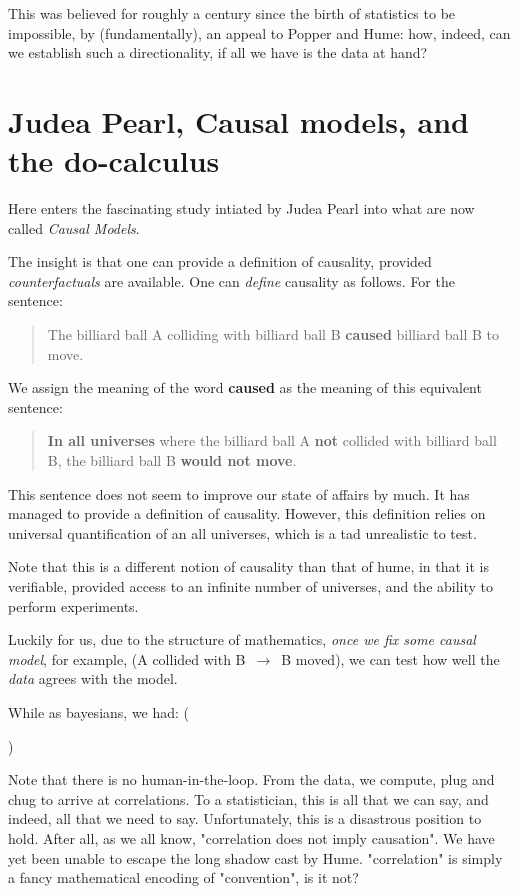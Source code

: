 \documentclass{article}
\begin{document}
This was believed for roughly a century since the birth of statistics to be
impossible, by (fundamentally), an appeal to Popper and Hume: how, indeed,
can we establish such a directionality, if all we have is the data at hand?

\section{Judea Pearl, Causal models, and the do-calculus}

Here enters the fascinating study intiated by Judea Pearl into what are now
called \emph{Causal Models}. 

The insight is that one can provide a definition of causality, provided
\emph{counterfactuals} are available. One can \textit{define} causality 
as follows. For the sentence:
\begin{quote}
    The billiard ball A colliding with billiard ball B \textbf{caused} billiard ball B to move.
\end{quote}
We assign the meaning of the word \textbf{caused} as the meaning of this
equivalent sentence:
\begin{quote}
    \textbf{In all universes} where the billiard ball A \textbf{not} collided with
    billiard ball B, the billiard ball B \textbf{would not move}.
\end{quote}

This sentence does not seem to improve our state of affairs by much. It has managed
to provide a definition of causality. However, this definition relies on universal
quantification of an all universes, which is a tad unrealistic to test.

Note that this is a different notion of causality than that of hume, in that
it is verifiable, provided access to an infinite number of universes, and the
ability to perform experiments.

Luckily for us, due to the structure of mathematics, \emph{once we fix some causal model}, 
for example, (A collided with B~$\rightarrow$~B moved), we
can test how well the \emph{data} agrees with the model.

While as bayesians, we had:
()

Note that there is no human-in-the-loop. From the data, we compute, plug and chug
to arrive at correlations. To a statistician, this is all that we can say, and 
indeed, all that we need to say. Unfortunately, this is a disastrous position to
hold. After all, as we all know, "correlation does not imply causation". We have
yet been unable to escape the long shadow cast by Hume. "correlation" is simply
a fancy mathematical encoding of "convention", is it not?
\end{document}
